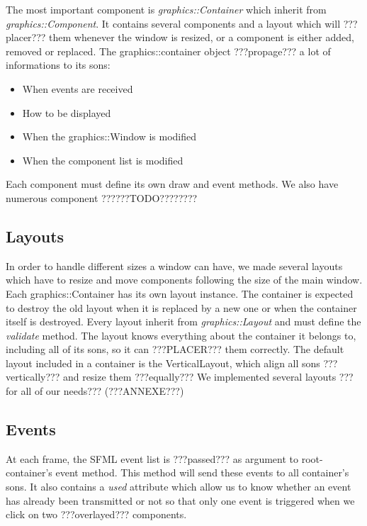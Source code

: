 \documentclass{scrreprt}
\begin{document}
		  The most important component is \emph{graphics::Container} which inherit from \emph{graphics::Component}. It contains several components and a layout which will ???placer??? them whenever the window is resized, or a component is either added, removed or replaced. The graphics::container object ???propage??? a lot of informations to its sons:
		  \begin{itemize}
		  \item{When events are received}
		  \item{How to be displayed}
		  \item{When the graphics::Window is modified}
		  \item{When the component list is modified}
		  \end{itemize}

		  Each component must define its own draw and event methods.
		  We also have numerous component ??????TODO????????

		  \subsection{Layouts}
		  In order to handle different sizes a window can have, we made several layouts which have to resize and move components following the size of the main window. Each graphics::Container has its own layout instance. The container is expected to destroy the old layout when it is replaced by a new one or when the container itself is destroyed. Every layout inherit from \emph{graphics::Layout} and must define the \emph{validate} method. 
		  The layout knows everything about the container it belongs to, including all of its sons, so it can ???PLACER??? them correctly.
	The default layout included in a container is the VerticalLayout, which align all sons ???vertically??? and resize them ???equally???
We implemented several layouts ???for all of our needs??? (???ANNEXE???)

	\subsection{Events}
	At each frame, the SFML event list is ???passed??? as argument to root-container's event method. This method will send these events to all container's sons. It also contains a \emph{used} attribute which allow us to know whether an event has already been transmitted or not so that only one event is triggered when we click on two ???overlayed??? components.\\
\end{document}
